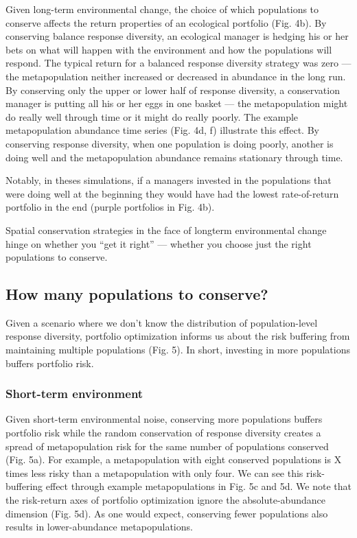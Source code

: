 Given long-term environmental change, the choice of which populations to
conserve affects the return properties of an ecological portfolio (Fig.
4b). By conserving balance response diversity, an ecological manager is
hedging his or her bets on what will happen with the environment and how
the populations will respond. The typical return for a balanced response
diversity strategy was zero --- the metapopulation neither increased or
decreased in abundance in the long run. By conserving only the upper or
lower half of response diversity, a conservation manager is putting all
his or her eggs in one basket --- the metapopulation might do really
well through time or it might do really poorly. The example
metapopulation abundance time series (Fig. 4d, f) illustrate this
effect. By conserving response diversity, when one population is doing
poorly, another is doing well and the metapopulation abundance remains
stationary through time.

Notably, in theses simulations, if a managers invested in the
populations that were doing well at the beginning they would have had
the lowest rate-of-return portfolio in the end (purple portfolios in
Fig. 4b).

Spatial conservation strategies in the face of longterm environmental
change hinge on whether you ``get it right'' --- whether you choose just
the right populations to conserve.

\subsection{How many populations to conserve?}

Given a scenario where we don't know the distribution of
population-level response diversity, portfolio optimization informs us
about the risk buffering from maintaining multiple populations (Fig. 5).
In short, investing in more populations buffers portfolio risk.

\subsubsection{Short-term environment}

Given short-term environmental noise, conserving more populations
buffers portfolio risk while the random conservation of response
diversity creates a spread of metapopulation risk for the same number of
populations conserved (Fig. 5a). For example, a metapopulation with
eight conserved populations is X times less risky than a metapopulation
with only four. We can see this risk-buffering effect through example
metapopulations in Fig. 5c and 5d. We note that the risk-return axes of
portfolio optimization ignore the absolute-abundance dimension (Fig.
5d). As one would expect, conserving fewer populations also results in
lower-abundance metapopulations.

